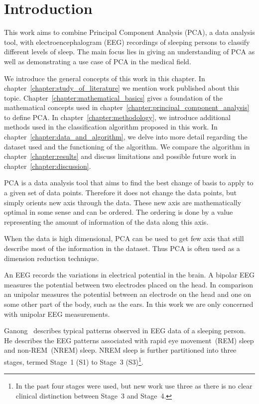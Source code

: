 \chapter{Introduction}
\label{chapter:introduction}

This work aims to combine Principal Component Analysis (PCA), a data analysis tool, with electroencephalogram (EEG) recordings of sleeping persons \color{change} to classify different levels of sleep. \color{black} The main focus lies in giving an understanding of PCA as well as demonstrating a use case \color{change} of PCA in the medical field. \color{black}

We introduce the general concepts of this work in this chapter. In chapter~\ref{chapter:study_of_literature} we mention work published about this topic. Chapter~\ref{chapter:mathematical_basics} gives a foundation of the mathematical concepts used in chapter~\ref{chapter:principal_component_analysis} to define PCA. In chapter~\ref{chapter:methodology}, we introduce additional methods used in the classification algorithm proposed in this work. In chapter~\ref{chapter:data_and_algorithm}, we delve into more detail regarding the dataset used and the functioning of the algorithm. We compare the algorithm in chapter~\ref{chapter:results} and discuss limitations and possible future work in chapter~\ref{chapter:discussion}.

PCA is a data analysis tool that aims to find the best change of basis to apply to a given set of data points. Therefore it does not change the data points, but simply orients new axis through the data. These new axis are mathematically optimal in some sense and can be ordered. The ordering is done by a value representing the amount of information of the data along this axis.

When the data is high dimensional, PCA can be used to get few axis that still describe most of the information in the dataset. Thus PCA is often used as a dimension reduction technique.


An EEG records the variations in electrical potential in the brain. A bipolar EEG measures the potential between two electrodes placed on the head. In comparison an unipolar measures the potential between an electrode on the head and one on some other part of the body, such as the ears. In this work we are only concerned with unipolar EEG measurements.

Ganong~\cite[chapter~11]{Ganong1997} describes typical patterns observed in EEG data of a sleeping person. He describes the EEG patterns associated with rapid eye movement~(REM) sleep and non-REM~(NREM) sleep. NREM sleep is further partitioned into three stages, termed Stage~1 (S1) to Stage~3 (S3)\footnote{\color{change} In the past four stages were used, but new work use three as there is no clear clinical distinction between Stage~3 and Stage~4. \color{black}}.

